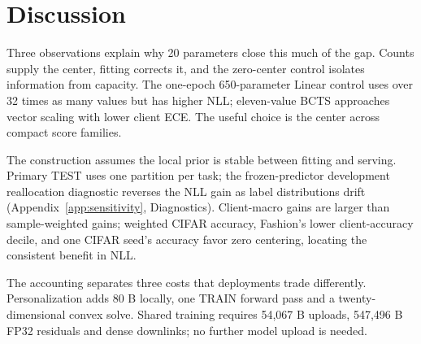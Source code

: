\section{Discussion}
Three observations explain why 20 parameters close this much of the gap. Counts supply the center, fitting corrects it, and the zero-center control isolates information from capacity. The one-epoch 650-parameter Linear control uses over 32 times as many values but has higher NLL; eleven-value BCTS approaches vector scaling with lower client ECE. The useful choice is the center across compact score families.

The construction assumes the local prior is stable between fitting and serving. Primary TEST uses one partition per task; the frozen-predictor development reallocation diagnostic reverses the NLL gain as label distributions drift (Appendix~\ref{app:sensitivity}, Diagnostics). Client-macro gains are larger than sample-weighted gains; weighted CIFAR accuracy, Fashion's lower client-accuracy decile, and one CIFAR seed's accuracy favor zero centering, locating the consistent benefit in NLL.

The accounting separates three costs that deployments trade differently. Personalization adds 80 B locally, one TRAIN forward pass and a twenty-dimensional convex solve. Shared training requires 54,067 B uploads, 547,496 B FP32 residuals and dense downlinks; no further model upload is needed.